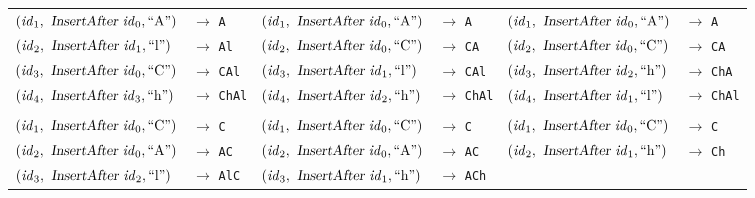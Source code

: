 \begin{figure}
\setlength{\tabcolsep}{3pt}
\begin{tabular}{ll|ll|ll}
$(\mathit{id}_1, \isa{InsertAfter } \mathit{id}_0, \text{``A''})$ & $\rightarrow$ \texttt{A} &
$(\mathit{id}_1, \isa{InsertAfter } \mathit{id}_0, \text{``A''})$ & $\rightarrow$ \texttt{A} &
$(\mathit{id}_1, \isa{InsertAfter } \mathit{id}_0, \text{``A''})$ & $\rightarrow$ \texttt{A} \\
$(\mathit{id}_2, \isa{InsertAfter } \mathit{id}_1, \text{``l''})$ & $\rightarrow$ \texttt{Al} &
$(\mathit{id}_2, \isa{InsertAfter } \mathit{id}_0, \text{``C''})$ & $\rightarrow$ \texttt{CA} &
$(\mathit{id}_2, \isa{InsertAfter } \mathit{id}_0, \text{``C''})$ & $\rightarrow$ \texttt{CA} \\
$(\mathit{id}_3, \isa{InsertAfter } \mathit{id}_0, \text{``C''})$ & $\rightarrow$ \texttt{CAl} &
$(\mathit{id}_3, \isa{InsertAfter } \mathit{id}_1, \text{``l''})$ & $\rightarrow$ \texttt{CAl} &
$(\mathit{id}_3, \isa{InsertAfter } \mathit{id}_2, \text{``h''})$ & $\rightarrow$ \texttt{ChA} \\
$(\mathit{id}_4, \isa{InsertAfter } \mathit{id}_3, \text{``h''})$ & $\rightarrow$ \texttt{ChAl} &
$(\mathit{id}_4, \isa{InsertAfter } \mathit{id}_2, \text{``h''})$ & $\rightarrow$ \texttt{ChAl} &
$(\mathit{id}_4, \isa{InsertAfter } \mathit{id}_1, \text{``l''})$ & $\rightarrow$ \texttt{ChAl} \\[6pt] \hline &&&&&\\[-6pt]
$(\mathit{id}_1, \isa{InsertAfter } \mathit{id}_0, \text{``C''})$ & $\rightarrow$ \texttt{C} &
$(\mathit{id}_1, \isa{InsertAfter } \mathit{id}_0, \text{``C''})$ & $\rightarrow$ \texttt{C} &
$(\mathit{id}_1, \isa{InsertAfter } \mathit{id}_0, \text{``C''})$ & $\rightarrow$ \texttt{C} \\
$(\mathit{id}_2, \isa{InsertAfter } \mathit{id}_0, \text{``A''})$ & $\rightarrow$ \texttt{AC} &
$(\mathit{id}_2, \isa{InsertAfter } \mathit{id}_0, \text{``A''})$ & $\rightarrow$ \texttt{AC} &
$(\mathit{id}_2, \isa{InsertAfter } \mathit{id}_1, \text{``h''})$ & $\rightarrow$ \texttt{Ch} \\
$(\mathit{id}_3, \isa{InsertAfter } \mathit{id}_2, \text{``l''})$ & $\rightarrow$ \texttt{AlC} &
$(\mathit{id}_3, \isa{InsertAfter } \mathit{id}_1, \text{``h''})$ & $\rightarrow$ \texttt{ACh} &

\end{tabular}
\end{figure}
